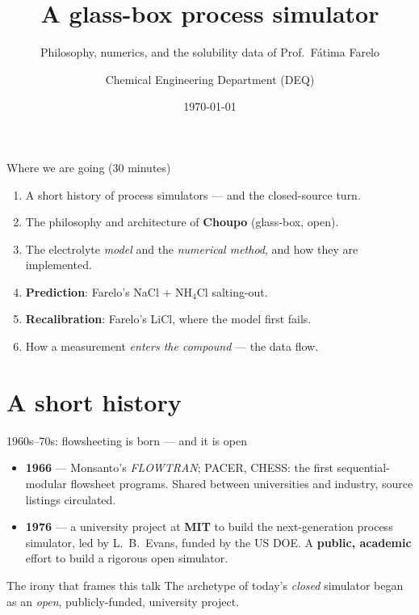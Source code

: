 \documentclass[aspectratio=169,11pt]{beamer}
\title[Choupo $\times$ Farelo]{A glass-box process simulator}
\subtitle{Philosophy, numerics, and the solubility data of Prof.\ F\'atima Farelo}
\author[Choupo]{Chemical Engineering Department (DEQ)}
\institute[IST]{Instituto Superior T\'ecnico --- T\'ecnico Lisboa}
\date{\today}
\begin{document}
\begin{frame}\titlepage\end{frame}

\begin{frame}{Where we are going (30 minutes)}
\begin{enumerate}
  \item A short history of process simulators --- and the closed-source turn.
  \item The philosophy and architecture of \textbf{Choupo} (glass-box, open).
  \item The electrolyte \emph{model} and the \emph{numerical method}, and how
        they are implemented.
  \item \textbf{Prediction}: Farelo's NaCl + NH$_4$Cl salting-out.
  \item \textbf{Recalibration}: Farelo's LiCl, where the model first fails.
  \item How a measurement \emph{enters the compound} --- the data flow.
\end{enumerate}
\end{frame}

\section{A short history}

\begin{frame}{1960s--70s: flowsheeting is born --- and it is open}
\begin{itemize}
  \item \textbf{1966} --- Monsanto's \emph{FLOWTRAN}; PACER, CHESS: the first
        sequential-modular flowsheet programs. Shared between universities and
        industry, source listings circulated.
  \item \textbf{1976} --- a university project at \textbf{MIT} to build the
        next-generation process simulator, led by L.~B.~Evans, funded by the US DOE.
        A \textbf{public, academic} effort to build a rigorous open simulator.
\end{itemize}
\vspace{0.5em}
\begin{block}{The irony that frames this talk}
The archetype of today's \emph{closed} simulator began as an \emph{open},
publicly-funded, university project.
\end{block}
\end{frame}
\end{document}
